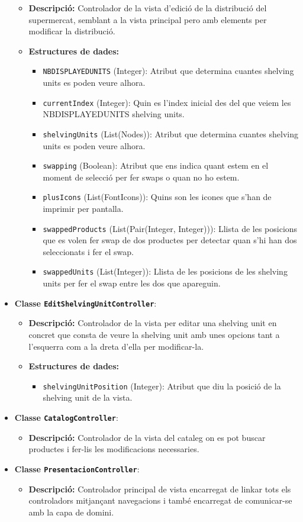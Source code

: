 \documentclass[a4paper,12pt]{report}
\begin{document}
\begin{itemize}
	\begin{itemize}
		\item \textbf{Descripció:} Controlador de la vista d'edició de la distribució del supermercat, semblant a la vista principal pero amb elements per modificar la distribució.
		\item \textbf{Estructures de dades:}
		\begin{itemize}
			\item \texttt{NBDISPLAYEDUNITS} (Integer): Atribut que determina cuantes shelving units es poden veure alhora.
			\item \texttt{currentIndex} (Integer): Quin es l'index inicial des del que veiem les NBDISPLAYEDUNITS shelving units.
			\item \texttt{shelvingUnits} (List(Nodes)): Atribut que determina cuantes shelving units es poden veure alhora.
			\item \texttt{swapping} (Boolean): Atribut que ens indica quant estem en el moment de selecció per fer swaps o quan no ho estem.
			\item \texttt{plusIcons} (List(FontIcons)): Quins son les icones que s'han de imprimir per pantalla.
			\item \texttt{swappedProducts} (List(Pair(Integer, Integer))): Llista de les posicions que es volen fer swap de dos productes per detectar quan s'hi han dos seleccionats i fer el swap.
			\item \texttt{swappedUnits} (List(Integer)): Llista de les posicions de les shelving units per fer el swap entre les dos que apareguin.
		\end{itemize}
	\end{itemize}
	\item \textbf{Classe \texttt{EditShelvingUnitController}}:
	\begin{itemize}
		\item \textbf{Descripció:} Controlador de la vista per editar una shelving unit en concret que consta de veure la shelving unit amb unes opcions tant a l'esquerra com a la dreta d'ella per modificar-la.
		\item \textbf{Estructures de dades:}
		\begin{itemize}
			\item \texttt{shelvingUnitPosition} (Integer): Atribut que diu la posició de la shelving unit de la vista.
		\end{itemize}
	\end{itemize}
	\item \textbf{Classe \texttt{CatalogController}}:
	\begin{itemize}
		\item \textbf{Descripció:} Controlador de la vista del cataleg on es pot buscar productes i fer-lis les modificacions necessaries.
	\end{itemize}
	\item \textbf{Classe \texttt{PresentacionController}}:
	\begin{itemize}
		\item \textbf{Descripció:} Controlador principal de vista encarregat de linkar tots els controladors mitjançant navegacions i també encarregat de comunicar-se amb la capa de domini.
	\end{itemize}


\end{itemize}
\end{document}
